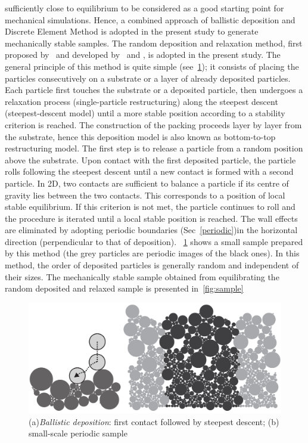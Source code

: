 sufficiently close to 
equilibrium to be considered as a good starting point for mechanical 
simulations. Hence, a 
combined 
approach of ballistic deposition and Discrete Element Method is adopted in the 
present study 
to generate mechanically stable samples. The random deposition and relaxation 
method, first 
proposed by~\citet{vold1959a,vold1959b} and developed by~\citet{jullien1992} 
and 
\citet{meakin1985}, is adopted in the present study. The general principle of 
this method is quite 
simple (see~\cref{fig:ballistic}); it consists of placing the particles 
consecutively on a 
substrate or a layer of already deposited particles. Each particle first 
touches the substrate or 
a 
deposited particle, then undergoes a relaxation process (single-particle 
restructuring) along the 
steepest descent (steepest-descent model) until a more stable position 
according to a stability 
criterion is reached. The construction of the packing proceeds layer by layer 
from the substrate, 
hence this deposition model is also known as bottom-to-top restructuring model. 
The first step is 
to release a particle from a random position above the substrate. Upon contact 
with the first 
deposited particle, the particle rolls following the steepest descent until a 
new contact is 
formed 
with a second particle. In 2D, two contacts are sufficient to balance a 
particle if its centre of 
gravity lies between the two contacts. This corresponds to a position of local 
stable equilibrium. 
If this criterion is not met, the particle continues to roll and the procedure 
is iterated until a 
local stable position is reached. The wall effects are eliminated by adopting 
periodic boundaries 
(Sec~\ref{periodic})in the horizontal direction (perpendicular to that of 
deposition). 
~\cref{fig:ballistic} shows a small sample prepared by this method (the grey 
particles are 
periodic images of the black ones). In this method, the order of deposited 
particles is generally 
random and independent of their sizes. The mechanically stable sample obtained 
from equilibrating 
the random deposited and relaxed sample is presented in~\cref{fig:sample} 
\begin{figure}[htbp]
\centering
\includegraphics[scale=0.1]{ballistic}
\caption{(a)\textit{Ballistic deposition}: first contact followed by steepest 
descent; (b) 
small-scale periodic sample~\citep{Radjai2011}}
\label{fig:ballistic}
\end{figure} 

